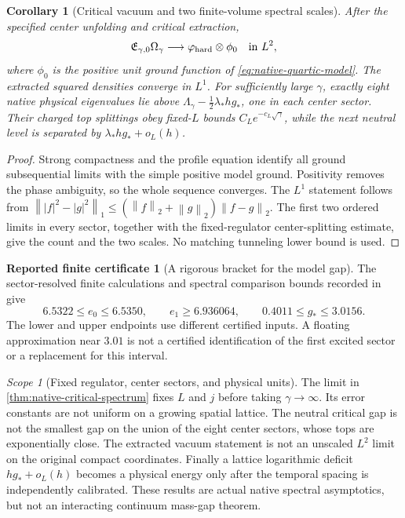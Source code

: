 \documentclass[11pt,oneside,openany]{book}
\newtheorem{corollary}[corollary]{Corollary}
\theoremstyle{definition}
\newtheorem{certificate}[certificate]{Reported finite certificate}
\theoremstyle{remark}
\newtheorem{scope}[scope]{Scope}
\newcommand{\norm}[1]{\left\lVert#1\right\rVert}
\newcommand{\src}[2]{\cite[#2]{#1}}
\begin{document}
\begin{corollary}[Critical vacuum and two finite-volume spectral scales]
\label{cor:native-vacuum-two-scales}
After the specified center unfolding and critical extraction,
\begin{equation}
 \mathfrak E_{\gamma,0}\Omega_\gamma
       \longrightarrow\varphi_{\rm hard}\otimes\phi_0
                       \quad\text{in }L^2,
 \label{eq:native-critical-vacuum}
\end{equation}
where $\phi_0$ is the positive unit ground function of
\cref{eq:native-quartic-model}. The extracted squared densities converge
in $L^1$. For sufficiently large $\gamma$, exactly eight native
physical eigenvalues lie above
$\Lambda_\gamma-\tfrac12\lambda_*hg_*$, one in each center sector.
Their charged top splittings obey fixed-$L$ bounds
$C_Le^{-c_L\sqrt\gamma}$, while the next neutral level is separated
by $\lambda_*hg_*+o_L(h)$.
\end{corollary}
\begin{proof}
Strong compactness and the profile equation identify all ground
subsequential limits with the simple positive model ground. Positivity
removes the phase ambiguity, so the whole sequence converges.
The $L^1$ statement follows from
$\norm{|f|^2-|g|^2}_1\le(\norm f_2+\norm g_2)\norm{f-g}_2$.
The first two ordered limits in every sector, together with the
fixed-regulator center-splitting estimate, give the count and the
two scales. No matching tunneling lower bound is used.
\end{proof}

\begin{certificate}[A rigorous bracket for the model gap]
\label{cert:quartic-model-gap}
The sector-resolved finite calculations and spectral comparison
bounds recorded in \src{F16}{V51, V57, V60} give
\[
 6.5322\le e_0\le6.5350,\qquad e_1\ge6.936064,
 \qquad 0.4011\le g_*\le3.0156.
\]
The lower and upper endpoints use different certified inputs. A
floating approximation near $3.01$ is not a certified identification
of the first excited sector or a replacement for this interval.
\end{certificate}

\begin{scope}[Fixed regulator, center sectors, and physical units]
The limit in \cref{thm:native-critical-spectrum} fixes $L$ and $j$
before taking $\gamma\to\infty$. Its error constants are not uniform
on a growing spatial lattice. The neutral critical gap is not the
smallest gap on the union of the eight center sectors, whose tops are
exponentially close. The extracted vacuum statement is not an unscaled
$L^2$ limit on the original compact coordinates. Finally a lattice
logarithmic deficit $hg_*+o_L(h)$ becomes a physical energy only after
the temporal spacing is independently calibrated. These results are
actual native spectral asymptotics, but not an interacting continuum
mass-gap theorem.
\end{scope}
\end{document}
